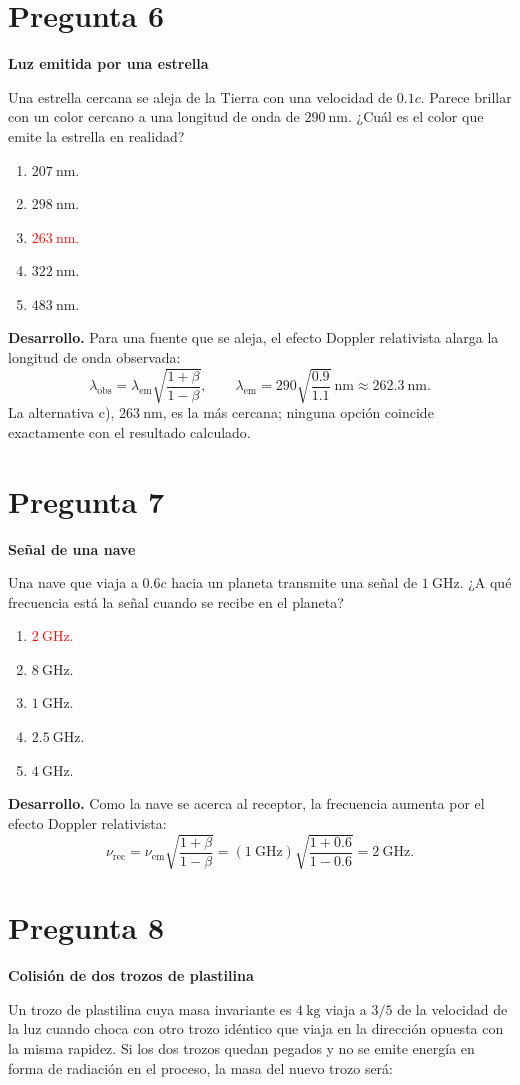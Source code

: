 \documentclass[a4paper,11pt]{article}
\newcommand{\pregunta}[2]{\section*{Pregunta #1}\textbf{#2}\par}
\begin{document}
\pregunta{6}{Luz emitida por una estrella}

Una estrella cercana se aleja de la Tierra con una velocidad de $0.1c$. Parece brillar con un color cercano a una longitud de onda de $290\ \mathrm{nm}$. ¿Cuál es el color que emite la estrella en realidad?

\begin{enumerate}
    \item $207\ \mathrm{nm}$.
    \item $298\ \mathrm{nm}$.
    \item \textcolor{red}{$263\ \mathrm{nm}$.}
    \item $322\ \mathrm{nm}$.
    \item $483\ \mathrm{nm}$.
\end{enumerate}

\textbf{Desarrollo.} Para una fuente que se aleja, el efecto Doppler relativista alarga la longitud de onda observada:
\[
\lambda_{\mathrm{obs}}=\lambda_{\mathrm{em}}\sqrt{\frac{1+\beta}{1-\beta}},
\qquad
\lambda_{\mathrm{em}}=290\sqrt{\frac{0.9}{1.1}}\ \mathrm{nm}
\approx262.3\ \mathrm{nm}.
\]
La alternativa c), $263\ \mathrm{nm}$, es la más cercana; ninguna opción coincide exactamente con el resultado calculado.
\parencite[Sec. 4.1, pp. 103--105]{chaparro2026}

\pregunta{7}{Señal de una nave}

Una nave que viaja a $0.6c$ hacia un planeta transmite una señal de $1\ \mathrm{GHz}$. ¿A qué frecuencia está la señal cuando se recibe en el planeta?

\begin{enumerate}
    \item \textcolor{red}{$2\ \mathrm{GHz}$.}
    \item $8\ \mathrm{GHz}$.
    \item $1\ \mathrm{GHz}$.
    \item $2.5\ \mathrm{GHz}$.
    \item $4\ \mathrm{GHz}$.
\end{enumerate}

\textbf{Desarrollo.} Como la nave se acerca al receptor, la frecuencia aumenta por el efecto Doppler relativista:
\[
\nu_{\mathrm{rec}}=\nu_{\mathrm{em}}\sqrt{\frac{1+\beta}{1-\beta}}
=(1\ \mathrm{GHz})\sqrt{\frac{1+0.6}{1-0.6}}
=2\ \mathrm{GHz}.
\]
\parencite[Sec. 4.1, pp. 103--105]{chaparro2026}

\pregunta{8}{Colisión de dos trozos de plastilina}

Un trozo de plastilina cuya masa invariante es $4\ \mathrm{kg}$ viaja a $3/5$ de la velocidad de la luz cuando choca con otro trozo idéntico que viaja en la dirección opuesta con la misma rapidez. Si los dos trozos quedan pegados y no se emite energía en forma de radiación en el proceso, la masa del nuevo trozo será:
\end{document}
